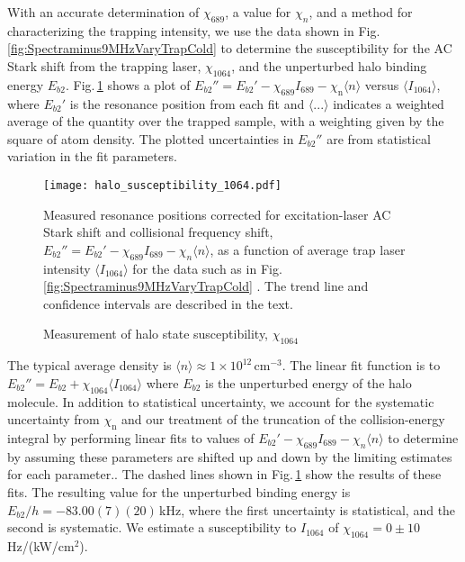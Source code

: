 With an accurate determination of $\chi_{689}$, a value for $\chi_n$, and a method for characterizing the trapping intensity, we use the data shown in Fig.\,\ref{fig:Spectraminus9MHzVaryTrapCold} to determine the susceptibility for the AC Stark shift from the trapping laser, $\chi_{1064}$, and the unperturbed halo binding energy $E_{b2}$.
Fig.\,\ref{fig:ShiftWithTrapIntensity} shows a plot of $E_{b2}'' = E_{b2}'-\chi_{689}I_{689} - \chi_{\text{n}}\langle n\rangle$ versus $\langle I_{1064} \rangle $, where $E_{b2}'$ is the resonance position from each fit and $\langle ... \rangle $ indicates a weighted average of the quantity over the trapped sample, with a weighting given by the square of atom density.
The plotted uncertainties in $E_{b2}''$ are from statistical variation in the fit parameters.
	\begin{figure} 
	\centerline{
	  \texttt{[image: halo\_susceptibility\_1064.pdf]}}
	  \caption{Measurement of halo state susceptibility, $\chi_{1064}$}{Measured resonance positions corrected for excitation-laser AC Stark shift and collisional frequency shift, $E_{b2}'' = E_{b2}'-\chi_{689} I_{689} - \chi_{n}\langle n\rangle$, as a function of average trap laser intensity $\langle I_{1064} \rangle$ for the data such as in Fig. \ref{fig:Spectraminus9MHzVaryTrapCold} . The trend line and confidence intervals are described in the text.}
	  \label{fig:ShiftWithTrapIntensity}
	\end{figure}

The typical average density is $\langle n\rangle\approx 1\times 10^{12}$\,cm$^{-3}$. 
The linear fit function is to $E_{b2}'' = E_{b2} + \chi_{1064}\langle I_{1064} \rangle $ where $E_{b2}$ is the unperturbed energy of the halo molecule.
In addition to statistical uncertainty, we account for the systematic uncertainty from $\chi_{\text{n}}$ and our treatment of the truncation of the collision-energy integral by performing linear fits to values of $E_{b2}'-\chi_{689} I_{689} - \chi_{n}\langle n\rangle$ to determine by assuming these parameters are shifted up and down by the limiting estimates for each parameter..
The dashed lines shown in Fig.\,\ref{fig:ShiftWithTrapIntensity} show the results of these fits.
The resulting value for the unperturbed binding energy is $E_{b2}/h=-83.00(7)(20)$\,kHz, where the first uncertainty is statistical, and the second is systematic.
We estimate a susceptibility to $I_{1064}$ of $\chi_{1064}=0\pm 10$\,Hz/(kW/cm$^2$).

